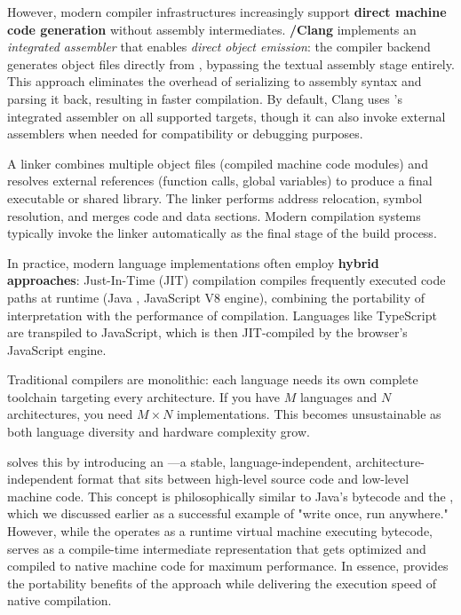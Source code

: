 \begin{description}
  However, modern compiler infrastructures increasingly support \textbf{direct machine code generation} without assembly intermediates. \textbf{/Clang} implements an \textit{integrated assembler} that enables \textit{direct object emission}: the compiler backend generates object files directly from  , bypassing the textual assembly stage entirely. This approach eliminates the overhead of serializing to assembly syntax and parsing it back, resulting in faster compilation. By default, Clang uses 's integrated assembler on all supported targets, though it can also invoke external assemblers when needed for compatibility or debugging purposes.

  \item[\textbf{Linker}] A linker combines multiple object files (compiled machine code modules) and resolves external references (function calls, global variables) to produce a final executable or shared library. The linker performs address relocation, symbol resolution, and merges code and data sections. Modern compilation systems typically invoke the linker automatically as the final stage of the build process.
\end{description}

In practice, modern language implementations often employ \textbf{hybrid approaches}: Just-In-Time (JIT) compilation compiles frequently executed code paths at runtime (Java , JavaScript V8 engine), combining the portability of interpretation with the performance of compilation. Languages like TypeScript are transpiled to JavaScript, which is then JIT-compiled by the browser's JavaScript engine.

Traditional compilers are monolithic: each language needs its own complete toolchain targeting every architecture. If you have \(M\) languages and \(N\) architectures, you need \(M \times N\) implementations. This becomes unsustainable as both language diversity and hardware complexity grow.

 solves this by introducing an \textbf{}—a stable, language-independent, architecture-independent format that sits between high-level source code and low-level machine code. This concept is philosophically similar to Java's bytecode and the , which we discussed earlier as a successful example of "write once, run anywhere." However, while the  operates as a runtime virtual machine executing bytecode,   serves as a compile-time intermediate representation that gets optimized and compiled to native machine code for maximum performance. In essence,  provides the portability benefits of the  approach while delivering the execution speed of native compilation.

